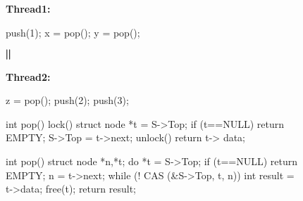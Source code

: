 \begin{figure*}[t]
\begin{minipage}{5cm}
\begin{minipage}{1.8cm}
\bigskip
{\bf Thread1:}
\vspace{-1mm}
\begin{program}
push(1);
x = pop();
y = pop();
\end{program}
\end{minipage}
\begin{minipage}{.5cm}
\vspace{6mm}
{\large $\bigparallel$}
\end{minipage}
\begin{minipage}{2cm}
\bigskip
{\bf Thread2:}
\vspace{-1mm}
\begin{program}
z = pop();
push(2);
push(3);
\end{program}
\end{minipage}
\end{minipage}
\begin{minipage}{6.5cm}
\lstset{firstnumber=10}
\begin{program}
int pop() {
	lock()
	struct node *t = S->Top;
	if (t==NULL)
		return EMPTY;
	S->Top = t->next;
	unlock()
	return t-> data;
}
\end{program}
\end{minipage}
\begin{minipage}{6cm}
\lstset{firstnumber=10}
\begin{program}
int pop() {
	struct node *n,*t;
	do {
		*t = S->Top;
		if (t==NULL)
			return EMPTY;
		n = t->next;
	} while (! CAS (&S->Top, t, n))
	int result = t->data;
	free(t);
	return result;
}

\end{program}
\end{minipage}

{\footnotesize
\hspace{.2cm}
\hspace{0.7cm}
\hspace{2.8cm}

}
\end{figure*}
